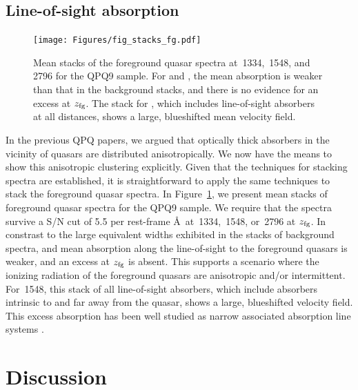 \documentclass[iop]{emulateapj}
\begin{document}
\subsection{Line-of-sight absorption}
\label{sec:los_stacks}

\begin{figure}
\texttt{[image: Figures/fig\_stacks\_fg.pdf]}
\caption{Mean stacks of the foreground quasar spectra at \,1334, \,1548, and 
\,2796 for the QPQ9 sample. For  and , the mean absorption is 
weaker than that in the background stacks, and there is no evidence for an excess at $z_{\rm fg}$. 
The stack for , which includes line-of-sight absorbers at all distances, shows a large, 
blueshifted mean velocity field.
}
\label{fig:stacks_fg}
\end{figure}

In the previous QPQ papers, we argued that optically thick absorbers in the vicinity of quasars 
are distributed anisotropically. We now have the means to show this anisotropic clustering 
explicitly. Given that the techniques for stacking spectra are established, it is straightforward 
to apply the same techniques to stack the foreground quasar spectra. In 
Figure~\ref{fig:stacks_fg}, we present mean stacks of foreground quasar spectra for 
the QPQ9 sample. We require that the spectra survive a S/N cut of 5.5 per rest-frame \AA\ at 
\,1334, \,1548, or \,2796 at $z_{\rm fg}$. In constrast to the 
large equivalent widths exhibited in the stacks of background spectra,  and  
mean absorption along the line-of-sight to the foreground quasars is weaker, and an excess at 
$z_{\rm fg}$ is absent. This supports a scenario where the ionizing radiation of the foreground 
quasars are anisotropic and/or intermittent. For \,1548, this stack of all line-of-sight 
absorbers, which include absorbers intrinsic to and far away from the quasar, shows a large, 
blueshifted velocity field. This excess  absorption has been well studied as narrow 
associated absorption line systems \citep[e.g., ][]{Wild+08}. 

\section{Discussion}
\label{sec:discussion}
\end{document}
